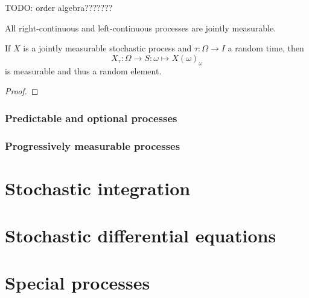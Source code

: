 TODO: order algebra???????

\begin{lemma}
All right-continuous and left-continuous processes are jointly measurable. 
\end{lemma}

\begin{proposition}
If $X$ is a jointly measurable stochastic process and $\tau: \Omega\to I$ a random time, then
\[ X_\tau: \Omega\to S: \omega\mapsto X(\omega)_{\omega} \]
is measurable and thus a random element.
\end{proposition}
\begin{proof}

\end{proof}

\subsubsection{Predictable and optional processes}

\subsubsection{Progressively measurable processes}

\section{Stochastic integration}

\section{Stochastic differential equations}

\section{Special processes}